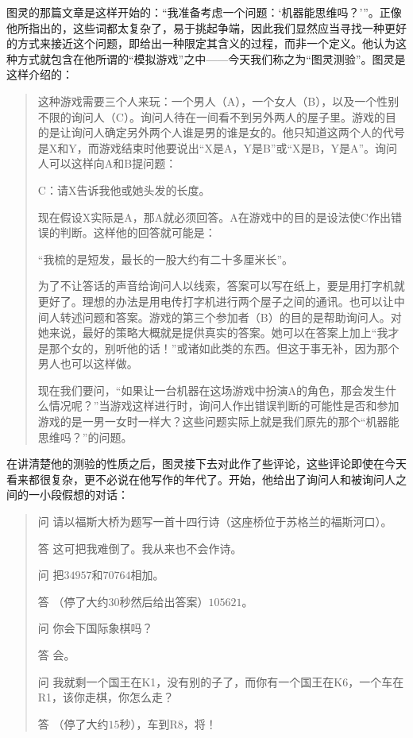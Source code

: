 图灵的那篇文章是这样开始的：“我准备考虑一个问题：‘机器能思维吗？’”。正像他所指出的，这些词都太复杂了，易于挑起争端，因此我们显然应当寻找一种更好的方式来接近这个问题，即给出一种限定其含义的过程，而非一个定义。他认为这种方式就包含在他所谓的“模拟游戏”之中——今天我们称之为“图灵测验”。图灵是这样介绍的：

\begin{quote}
这种游戏需要三个人来玩：一个男人（A），一个女人（B），以及一个性别不限的询问人（C）。询问人待在一间看不到另外两人的屋子里。游戏的目的是让询问人确定另外两个人谁是男的谁是女的。他只知道这两个人的代号是X和Y，而游戏结束时他要说出“X是A，Y是B”或“X是B，Y是A”。询问人可以这样向A和B提问题：

C：请X告诉我他或她头发的长度。

现在假设X实际是A，那A就必须回答。A在游戏中的目的是设法使C作出错误的判断。这样他的回答就可能是：

“我梳的是短发，最长的一股大约有二十多厘米长”。

为了不让答话的声音给询问人以线索，答案可以写在纸上，要是用打字机就更好了。理想的办法是用电传打字机进行两个屋子之间的通讯。也可以让中间人转述问题和答案。游戏的第三个参加者（B）的目的是帮助询问人。对她来说，最好的策略大概就是提供真实的答案。她可以在答案上加上“我才是那个女的，别听他的话！”或诸如此类的东西。但这于事无补，因为那个男人也可以这样做。

现在我们要问，“如果让一台机器在这场游戏中扮演A的角色，那会发生什么情况呢？”当游戏这样进行时，询问人作出错误判断的可能性是否和参加游戏的是一男一女时一样大？这些问题实际上就是我们原先的那个“机器能思维吗？”的问题。
\end{quote}
在讲清楚他的测验的性质之后，图灵接下去对此作了些评论，这些评论即使在今天看来都很复杂，更不必说在他写作的年代了。开始，他给出了询问人和被询问人之间的一小段假想的对话：
\begin{quote}
\begin{dialogue}[labelwidth=\ccwd,leftmargin=2\ccwd]
\item[问]请以福斯大桥为题写一首十四行诗（这座桥位于苏格兰的福斯河口）。
\item[答]这可把我难倒了。我从来也不会作诗。
\item[问]把$34957$和$70764$相加。
\item[答]（停了大约$30$秒然后给出答案）$105621$。
\item[问]你会下国际象棋吗？
\item[答]会。
\item[问]我就剩一个国王在K1，没有别的子了，而你有一个国王在K6，一个车在R1，该你走棋，你怎么走？
\item[答]（停了大约$15$秒），车到R8，将！
\end{dialogue}
\end{quote}
